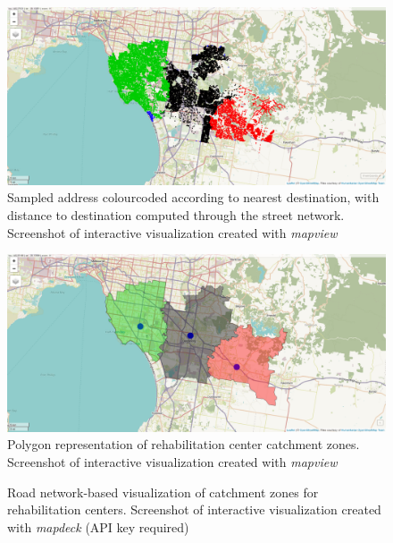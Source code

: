 \documentclass[utf8]{frontiersHLTH}
\begin{document}
\begin{figure}[h!]
\begin{center}
\includegraphics[width=12cm]{map4_mv.png}
\end{center}
\caption{Sampled address colourcoded according to nearest destination, with distance to destination computed through the street network. Screenshot of interactive visualization created with {\em mapview}}\label{fig:RehabCenterAddressCatchments}
\end{figure}

\begin{figure}[h!]
\begin{center}
\includegraphics[width=12cm]{map5_mv.png}
\end{center}
\caption{Polygon representation of rehabilitation center catchment zones. Screenshot of interactive visualization created with {\em mapview}}\label{fig:RehabCenterPolyCatchments}
\end{figure}

\begin{figure}[h!]
\begin{center}
\end{center}
\caption{Road network-based visualization of catchment zones for rehabilitation centers. Screenshot of interactive visualization created with {\em mapdeck} (API key required)}\label{fig:RehabCenterRoadCatchment}
\end{figure}
\end{document}
